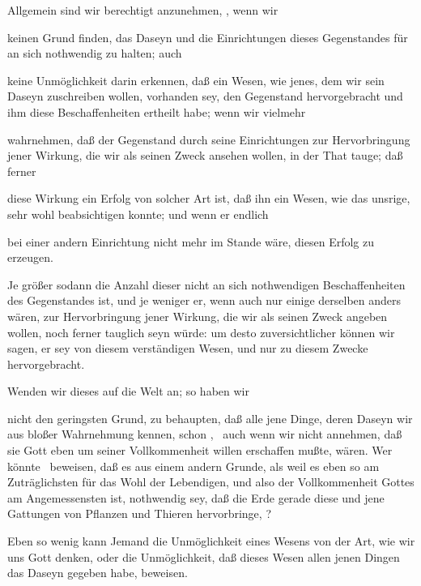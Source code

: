 \begin{aufza}
\item Allgemein sind wir berechtigt anzunehmen, , wenn wir~
\begin{aufzb}
\item keinen Grund finden, das Daseyn und die Einrichtungen dieses Gegenstandes für an sich nothwendig zu halten; auch
\item keine Unmöglichkeit darin erkennen, daß ein Wesen, wie jenes, dem wir sein Daseyn zuschreiben wollen, vorhanden sey, den Gegenstand hervorgebracht und ihm diese Beschaffenheiten ertheilt habe; wenn wir vielmehr
\item wahrnehmen, daß der Gegenstand durch seine Einrichtungen zur Hervorbringung jener Wirkung, die wir als seinen Zweck ansehen wollen, in der That tauge; daß ferner
\item diese Wirkung ein Erfolg von solcher Art ist, daß ihn ein Wesen, wie das unsrige, sehr wohl beabsichtigen konnte; und wenn er endlich
\item bei einer andern Einrichtung nicht mehr im Stande wäre, diesen Erfolg zu erzeugen.
\end{aufzb}
Je größer sodann die Anzahl dieser nicht an sich nothwendigen Beschaffenheiten des Gegenstandes ist, und je weniger er, wenn auch nur einige derselben anders wären, zur Hervorbringung jener Wirkung, die wir als seinen Zweck angeben wollen, noch ferner tauglich seyn würde: um desto zuversichtlicher können wir sagen, er sey von diesem verständigen Wesen, und nur zu diesem Zwecke hervorgebracht.
\item Wenden wir dieses auf die Welt an; so haben wir
\begin{aufzb}
\item nicht den geringsten Grund, zu behaupten, daß alle jene Dinge, deren Daseyn wir aus bloßer Wahrnehmung kennen, schon , \dh\ auch wenn wir nicht annehmen, daß sie Gott eben um seiner Vollkommenheit willen erschaffen mußte,  wären. Wer könnte \zB\ beweisen, daß es aus einem andern Grunde, als weil es eben so am Zuträglichsten für das Wohl der Lebendigen, und also der Vollkommenheit Gottes am Angemessensten ist, nothwendig sey, daß die Erde gerade diese und jene Gattungen von Pflanzen und Thieren hervorbringe, \usw ?
\item Eben so wenig kann Jemand die Unmöglichkeit eines Wesens von der Art, wie wir uns Gott denken, oder die Unmöglichkeit, daß dieses Wesen allen jenen Dingen das Daseyn gegeben habe, beweisen.~

\end{aufzb}
\end{aufza}
